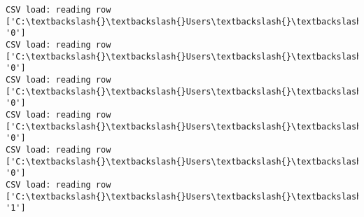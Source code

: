 \documentclass[11pt]{article}
\begin{document}
\begin{Verbatim}[commandchars=\\\{\}]
CSV load: reading row ['C:\textbackslash{}\textbackslash{}Users\textbackslash{}\textbackslash{}AbhishekGangadhar\textbackslash{}\textbackslash{}Downloads\textbackslash{}\textbackslash{}ActionRecog\textbackslash{}\textbackslash{}ActionRecog\textbackslash{}\textbackslash{}DataSets\textbackslash{}\textbackslash{}UCF11\textbackslash{}\textbackslash{}action\_youtube\_naudio\textbackslash{}\textbackslash{}biking\textbackslash{}\textbackslash{}v\_biking\_24\textbackslash{}\textbackslash{}v\_biking\_24\_04.avi', '0']
CSV load: reading row ['C:\textbackslash{}\textbackslash{}Users\textbackslash{}\textbackslash{}AbhishekGangadhar\textbackslash{}\textbackslash{}Downloads\textbackslash{}\textbackslash{}ActionRecog\textbackslash{}\textbackslash{}ActionRecog\textbackslash{}\textbackslash{}DataSets\textbackslash{}\textbackslash{}UCF11\textbackslash{}\textbackslash{}action\_youtube\_naudio\textbackslash{}\textbackslash{}biking\textbackslash{}\textbackslash{}v\_biking\_24\textbackslash{}\textbackslash{}v\_biking\_24\_05.avi', '0']
CSV load: reading row ['C:\textbackslash{}\textbackslash{}Users\textbackslash{}\textbackslash{}AbhishekGangadhar\textbackslash{}\textbackslash{}Downloads\textbackslash{}\textbackslash{}ActionRecog\textbackslash{}\textbackslash{}ActionRecog\textbackslash{}\textbackslash{}DataSets\textbackslash{}\textbackslash{}UCF11\textbackslash{}\textbackslash{}action\_youtube\_naudio\textbackslash{}\textbackslash{}biking\textbackslash{}\textbackslash{}v\_biking\_24\textbackslash{}\textbackslash{}v\_biking\_24\_06.avi', '0']
CSV load: reading row ['C:\textbackslash{}\textbackslash{}Users\textbackslash{}\textbackslash{}AbhishekGangadhar\textbackslash{}\textbackslash{}Downloads\textbackslash{}\textbackslash{}ActionRecog\textbackslash{}\textbackslash{}ActionRecog\textbackslash{}\textbackslash{}DataSets\textbackslash{}\textbackslash{}UCF11\textbackslash{}\textbackslash{}action\_youtube\_naudio\textbackslash{}\textbackslash{}biking\textbackslash{}\textbackslash{}v\_biking\_24\textbackslash{}\textbackslash{}v\_biking\_24\_07.avi', '0']
CSV load: reading row ['C:\textbackslash{}\textbackslash{}Users\textbackslash{}\textbackslash{}AbhishekGangadhar\textbackslash{}\textbackslash{}Downloads\textbackslash{}\textbackslash{}ActionRecog\textbackslash{}\textbackslash{}ActionRecog\textbackslash{}\textbackslash{}DataSets\textbackslash{}\textbackslash{}UCF11\textbackslash{}\textbackslash{}action\_youtube\_naudio\textbackslash{}\textbackslash{}biking\textbackslash{}\textbackslash{}v\_biking\_24\textbackslash{}\textbackslash{}v\_biking\_24\_08.avi', '0']
CSV load: reading row ['C:\textbackslash{}\textbackslash{}Users\textbackslash{}\textbackslash{}AbhishekGangadhar\textbackslash{}\textbackslash{}Downloads\textbackslash{}\textbackslash{}ActionRecog\textbackslash{}\textbackslash{}ActionRecog\textbackslash{}\textbackslash{}DataSets\textbackslash{}\textbackslash{}UCF11\textbackslash{}\textbackslash{}action\_youtube\_naudio\textbackslash{}\textbackslash{}golf\_swing\textbackslash{}\textbackslash{}v\_golf\_15\textbackslash{}\textbackslash{}v\_golf\_15\_01.avi', '1']

\end{Verbatim}
\end{document}
